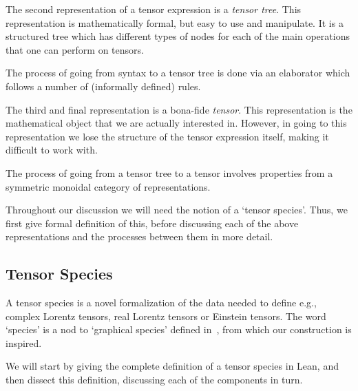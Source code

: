 \documentclass[a4paper, 11pt]{article}
\begin{document}
The second representation of a tensor expression is a \emph{tensor tree}. This representation is 
mathematically formal, but easy to use and manipulate. 
It is a structured tree which has different types 
of nodes for each of the main operations that one can perform on tensors.

The process of going from syntax to a tensor tree is done via an elaborator 
which follows a number of (informally defined) rules.

The third and final representation is a bona-fide \emph{tensor}. This representation 
is the mathematical object that we are actually interested in. However, in going to this representation
we lose the structure of the tensor expression itself, making it difficult to work with. 

The process of going from a tensor tree to a tensor involves properties from a symmetric monoidal 
category of representations. 

Throughout our discussion we will need the notion of a `tensor species'.
Thus, we first give formal definition of this, before discussing each of the above 
representations and the processes between them in more detail.

\subsection{Tensor Species}

A tensor species is a novel formalization of the data needed to define e.g., complex Lorentz tensors, 
real Lorentz tensors or Einstein tensors. The word `species' is a nod to `graphical species'
defined in~\cite{JOYAL2011105,raynor2021graphical}, from which our construction is inspired.

We will start by giving the complete definition of a tensor species in Lean, and then 
dissect this definition, discussing each of the components in turn. 
\end{document}
